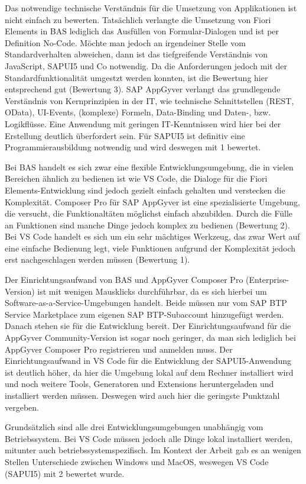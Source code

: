 Das notwendige technische Verständnis für die Umsetzung von Applikationen ist nicht einfach zu bewerten. Tatsächlich verlangte die Umsetzung von Fiori Elements in BAS lediglich das Ausfüllen von Formular-Dialogen und ist per Definition No-Code. Möchte man jedoch an irgendeiner Stelle vom Standardverhalten abweichen, dann ist das tiefgreifende Verständnis von JavaScript, SAPUI5 und Co notwendig. Da die Anforderungen jedoch mit der Standardfunktionalität umgestzt werden konnten, ist die Bewertung hier entsprechend gut (Bewertung 3). SAP AppGyver verlangt das grundlegende Verständnis von Kernprinzipien in der IT, wie technische Schnittstellen (REST, OData), UI-Events, (komplexe) Formeln, Data-Binding und Daten-, bzw. Logikflüsse. Eine Anwendung mit geringen IT-Kenntnissen wird hier bei der Erstellung deutlich überfordert sein. Für SAPUI5 ist definitiv eine Programmierausbildung notwendig und wird deswegen mit 1 bewertet.

Bei BAS handelt es sich zwar eine flexible Entwicklungsumgebung, die in vielen Bereichen ähnlich zu bedienen ist wie VS Code, die Dialoge für die Fiori Elements-Entwicklung sind jedoch gezielt einfach gehalten und verstecken die Komplexität. Composer Pro für SAP AppGyver ist eine spezialisierte Umgebung, die versucht, die Funktionaltäten möglichst einfach abzubilden. Durch die Fülle an Funktionen sind manche Dinge jedoch komplex zu bedienen (Bewertung 2). Bei VS Code handelt es sich um ein sehr mächtiges Werkzeug, das zwar Wert auf eine einfache Bedienung legt, viele Funktionen aufgrund der Komplexität jedoch erst nachgeschlagen werden müssen (Bewertung 1).

Der Einrichtungsaufwand von BAS und AppGyver Composer Pro (Enterprise-Version) ist mit wenigen Mausklicks durchführbar, da es sich hierbei um Software-as-a-Service-Umgebungen handelt. Beide müssen nur vom SAP BTP Service Marketplace zum eigenen SAP BTP-Subaccount hinzugefügt werden. Danach stehen sie für die Entwicklung bereit. Der Einrichtungsaufwand für die AppGyver Community-Version ist sogar noch geringer, da man sich lediglich bei AppGyver Composer Pro registrieren und anmelden muss. Der Einrichtungsaufwand in VS Code für die Entwicklung der SAPUI5-Anwendung ist deutlich höher, da hier die Umgebung lokal auf dem Rechner installiert wird und noch weitere Tools, Generatoren und Extensions heruntergeladen und installiert werden müssen. Deswegen wird auch hier die geringste Punktzahl vergeben.

Grundsätzlich sind alle drei Entwicklungsumgebungen unabhängig vom Betriebssystem. Bei VS Code müssen jedoch alle Dinge lokal installiert werden, mitunter auch betriebssystemspezifisch. Im Kontext der Arbeit gab es an wenigen Stellen Unterschiede zwischen Windows und MacOS, weswegen VS Code (SAPUI5) mit 2 bewertet wurde.

